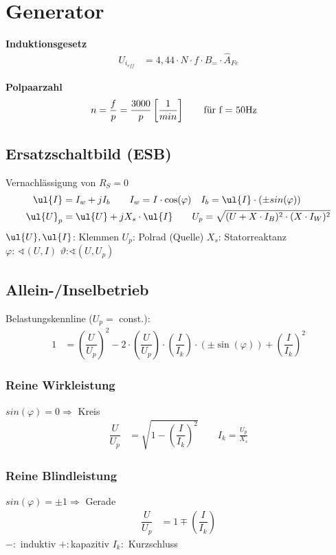 \clearpage
\section{Generator}
\textbf{Induktionsgesetz}
\begin{align*}
    U_{i_{\mathit{eff}}} &= 4,44 \cdot N \cdot f \cdot B_= \cdot \hat{A}_{Fe}
\end{align*}

\textbf{Polpaarzahl}
\begin{align*}
    n &=\frac{f}{p}= \dfrac{3000}{p} \left[ \frac{1}{min}\right] \qquad \textnormal{für f = 50Hz}
    \end{align*}

\subsection{Ersatzschaltbild (ESB)}
Vernachlässigung von $R_S = 0$
\begin{align*}
    \ul{I} &= I_w +jI_b \qquad I_w = I \cdot \cos(\varphi) \quad I_b = \ul{I}\cdot (\pm sin(\varphi))\\
    \ul{U}_p &= \ul{U} +jX_s \cdot \ul{I} \qquad
    U_p = \sqrt{(U+X\cdot I_B)^2 \cdot (X\cdot I_W)^2}
\end{align*}
$\ul{U}, \ul{I}$: Klemmen \quad $U_p$: Polrad (Quelle) \quad $X_s$: Statorreaktanz \\
$\varphi$: $\sphericalangle (U, I)$ \qquad $\vartheta$:$\sphericalangle (U, U_p)$

\subsection{Allein-/Inselbetrieb}
Belastungskennline ($U_p=$ const.):
\begin{align*}
    1 &= \left( \dfrac{U}{U_p} \right)^2 - 2 \cdot \left( \dfrac{U}{U_p}\right) \cdot \left( \dfrac{I}{I_k}\right) \cdot (\pm \sin(\varphi)) + \left(\dfrac{I}{I_k}\right)^2
\end{align*}
\subsubsection{Reine Wirkleistung}
$sin(\varphi) = 0 \Rightarrow$ Kreis
\begin{align*}
    \dfrac{U}{U_p} &= \sqrt{1- \left(\dfrac{I}{I_k}\right)^2} \qquad I_k = \frac{U_p}{X_s}
\end{align*}

\subsubsection{Reine Blindleistung}
$    sin(\varphi) = \pm1 \Rightarrow$ Gerade
\begin{align*}
    \dfrac{U}{U_p} &= 1 \mp \left(\dfrac{I}{I_k}\right)
\end{align*}
$- :$ induktiv \qquad $+ :$kapazitiv \qquad
$I_k :$ Kurzschluss

